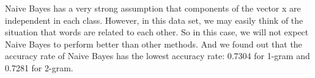 
Naive Bayes has a very strong assumption that components of the vector x are independent in each class. However, in this data set, we may easily think of the situation that words are related to each other. So in this case, we will not expect Naive Bayes to perform better than other methods. And we found out that the accuracy rate of Naive Bayes has the lowest accuracy rate: 0.7304 for 1-gram and 0.7281 for 2-gram. \\